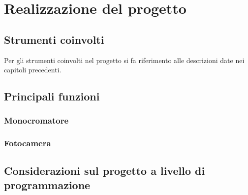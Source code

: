 \chapter{Realizzazione del progetto}
\thispagestyle{empty}

\section{Strumenti coinvolti}
Per gli strumenti coinvolti nel progetto si fa riferimento alle descrizioni date nei capitoli precedenti.

\section{Principali funzioni}

\subsection{Monocromatore}
\subsection{Fotocamera}

\section{Considerazioni sul progetto a livello di programmazione}
